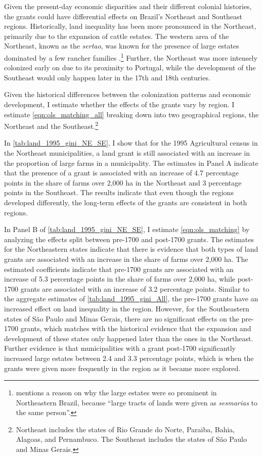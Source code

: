 \documentclass[11pt]{article}
\begin{document}
Given the present-day economic disparities and their different colonial histories, the grants could have differential effects on Brazil's Northeast and Southeast regions. 
Historically, land inequality has been more pronounced in the Northeast, primarily due to the expansion of cattle estates. 
The western area of the Northeast, known as the \textit{sertao}, was known for the presence of large estates dominated by a few rancher families \parencite[p.~460-461]{Bethell1984-of}.\footnote{\textcite[p.~53]{Da_Costa_Porto1979-dz} mentions a reason on why the large estates were so prominent in Northeastern Brazil, because ``large tracts of lands were given as \textit{sesmarias} to the same person''.}
Further, the Northeast was more intensely colonized early on due to its proximity to Portugal, while the development of the Southeast would only happen later in the 17th and 18th centuries. 

Given the historical differences between the colonization patterns and economic development, I estimate whether the effects of the grants vary by region.
I estimate \autoref{eqn:ols_matching_all} breaking down into two geographical regions, the Northeast and the Southeast.\footnote{Northeast includes the states of Rio Grande do Norte, Paraiba, Bahia, Alagoas, and Pernambuco. The Southeast includes the states of São Paulo and Minas Gerais.}


In \autoref{tab:land_1995_gini_NE_SE}, I show that for the 1995 Agricultural census in the Northeast municipalities, a land grant is still associated with an increase in the proportion of large farms in a municipality. 
The estimates in Panel A indicate that the presence of a grant is associated with an increase of 4.7 percentage points in the share of farms over 2,000 ha in the Northeast and 3 percentage points in the Southeast.
The results indicate that even though the regions developed differently, the long-term effects of the grants are consistent in both regions.

In Panel B of \autoref{tab:land_1995_gini_NE_SE}, I estimate \autoref{eqn:ols_matching} by analyzing the effects split between pre-1700 and post-1700 grants.
The estimates for the Northeastern states indicate that there is evidence that both types of land grants are associated with an increase in the share of farms over 2,000 ha. 
The estimated coefficients indicate that pre-1700 grants are associated with an increase of 5.3 percentage points in the share of farms over 2,000 ha, while post-1700 grants are associated with an increase of 3.2 percentage points. 
Similar to the aggregate estimates of \autoref{tab:land_1995_gini_All}, the pre-1700 grants have an increased effect on land inequality in the region.
However, for the Southeastern states of São Paulo and Minas Gerais, there are no significant effects on the pre-1700 grants, which matches with the historical evidence that the expansion and development of these states only happened later than the ones in the Northeast.
Further evidence is that municipalities with a grant post-1700 significantly increased large estates between 2.4 and 3.3 percentage points, which is when the grants were given more frequently in the region as it became more explored. 
\end{document}
